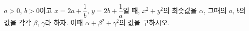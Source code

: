 $a>0$, $b>0$이고 $x=2a+\dfrac{1}{b}$, $y=2b+\dfrac{1}{a}$일 때, $x^2+y^2$의 최솟값을 $\alpha$, 그때의 $a$, $b$의 값을 각각 $\beta$, $\gamma$라 하자. 이때 $\alpha+\beta^2+\gamma^2$의 값을 구하시오.
